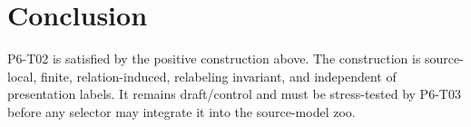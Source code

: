 \documentclass[11pt]{article}
\begin{document}
\section{Conclusion}

P6-T02 is satisfied by the positive construction above. The construction is
source-local, finite, relation-induced, relabeling invariant, and independent
of presentation labels. It remains draft/control and must be stress-tested by
P6-T03 before any selector may integrate it into the source-model zoo.
\end{document}
